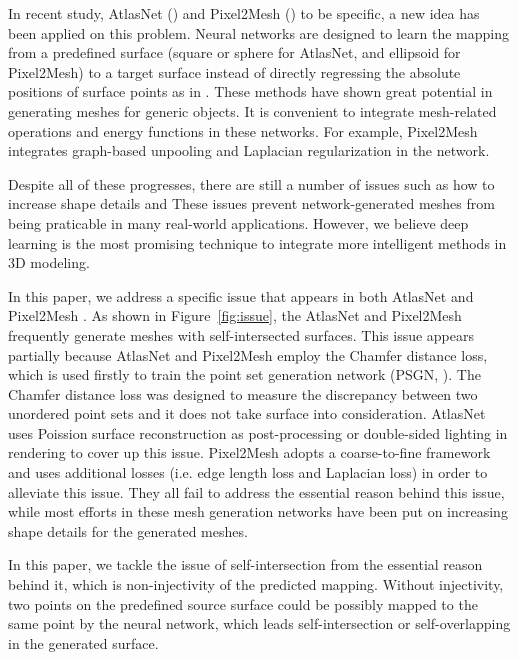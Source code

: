 In recent study, AtlasNet (\cite{atlasnet}) and Pixel2Mesh (\cite{pixel2mesh}) to be specific, a new idea has been applied on this problem. Neural networks are designed to learn the mapping from a predefined surface (square or sphere for AtlasNet, and ellipsoid for Pixel2Mesh) to a target surface instead of directly regressing the absolute positions of surface points as in \cite{PSGN}. These methods have shown great potential in generating meshes for generic objects. It is convenient to integrate mesh-related operations and energy functions in these networks. For example, Pixel2Mesh integrates graph-based unpooling and Laplacian regularization in the network.

Despite all of these progresses, there are still a number of issues such as how to increase shape details and  These issues prevent network-generated meshes from being praticable in many real-world applications. However, we believe deep learning is the most promising technique to integrate more intelligent methods in 3D modeling.

 In this paper, we address a specific issue that appears in both AtlasNet \cite{atlasnet} and Pixel2Mesh \cite{pixel2mesh}. As shown in Figure~\ref{fig:issue}, the AtlasNet and Pixel2Mesh frequently generate meshes with self-intersected surfaces. This issue appears partially because AtlasNet and Pixel2Mesh employ the Chamfer distance loss, which is used firstly to train the point set generation network (PSGN, \cite{PSGN}). The Chamfer distance loss was designed to measure the discrepancy between two unordered point sets and it does not take surface into consideration. AtlasNet uses Poission surface reconstruction as post-processing or double-sided lighting in rendering to cover up this issue. Pixel2Mesh adopts a coarse-to-fine framework and uses additional losses (i.e. edge length loss and Laplacian loss) in order to alleviate this issue. They all fail to address the essential reason behind this issue, while most efforts in these mesh generation networks have been put on increasing shape details for the generated meshes.

In this paper, we tackle the issue of self-intersection from the essential reason behind it, which is non-injectivity of the predicted mapping. Without injectivity, two points on the predefined source surface could be possibly mapped to the same point by the neural network, which leads self-intersection or self-overlapping in the generated surface.

